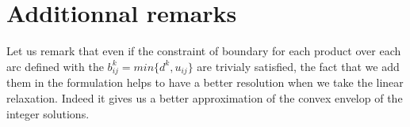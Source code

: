 \section{Additionnal remarks}

Let us remark that even if the constraint of boundary for each product over each arc defined with the $b^k_{ij}=min\{d^k,u_{ij}\}$ are trivialy satisfied, the fact that we add them in the formulation helps to have a better resolution when we take the linear relaxation. Indeed it gives us a better approximation of the convex envelop of the integer solutions.









